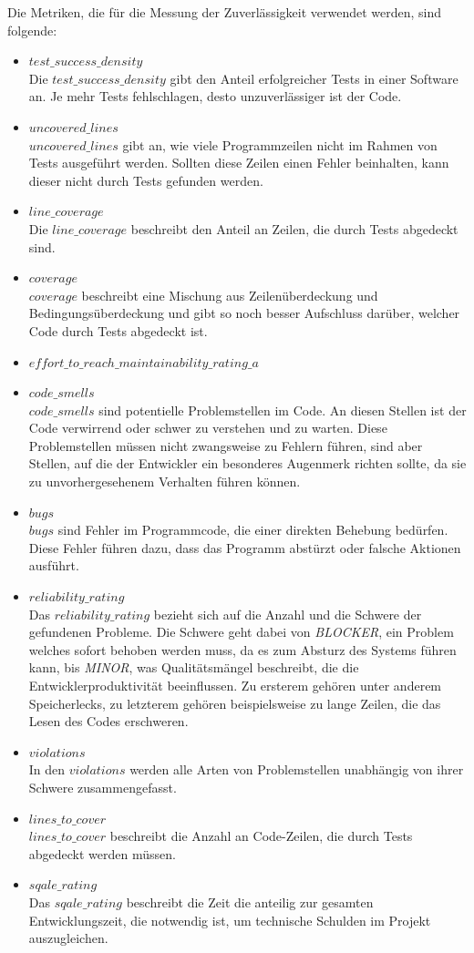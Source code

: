 \documentclass[
	oneside,  %
	ngerman, 
	final, 
	11pt, 
	a4paper, 
	1.1headlines, 
	headinclude=false, 
	footinclude=false, 
	mpinclude=false, 
	pagesize, 
	onecolumn, 
	titlepage, 
	parskip=half, 
	headsepline, 
	chapterprefix=false, 
	version=first, 
	listof=totoc, 
	bibliography=totoc, 
	toc=graduated, 
	fleqn
]{scrbook}
\begin{document}
Die Metriken, die für die Messung der Zuverlässigkeit verwendet werden, sind folgende:
\begin{itemize}
	\item $test\_success\_density$\\
	Die $test\_success\_density$ gibt den Anteil erfolgreicher Tests in einer Software an.
	Je mehr Tests fehlschlagen, desto unzuverlässiger ist der Code.
	\item $uncovered\_lines$\\
	$uncovered\_lines$ gibt an, wie viele Programmzeilen nicht im Rahmen von Tests ausgeführt werden.
	Sollten diese Zeilen einen Fehler beinhalten, kann dieser nicht durch Tests gefunden werden.
	\item $line\_coverage$\\
	Die $line\_coverage$ beschreibt den Anteil an Zeilen, die durch Tests abgedeckt sind.
	\item $coverage$\\
	$coverage$ beschreibt eine Mischung aus Zeilenüberdeckung und Bedingungsüberdeckung und gibt so noch besser Aufschluss darüber, welcher Code durch Tests abgedeckt ist.
	\item $effort\_to\_reach\_maintainability\_rating\_a$ %
	\item $code\_smells$\\
	$code\_smells$ sind potentielle Problemstellen im Code.
	An diesen Stellen ist der Code verwirrend oder schwer zu verstehen und zu warten.
	Diese Problemstellen müssen nicht zwangsweise zu Fehlern führen, sind aber Stellen, auf die der Entwickler ein besonderes Augenmerk richten sollte, da sie zu unvorhergesehenem Verhalten führen können.
	\item $bugs$\\
	$bugs$ sind Fehler im Programmcode, die einer direkten Behebung bedürfen.
	Diese Fehler führen dazu, dass das Programm abstürzt oder falsche Aktionen ausführt.
	\item $reliability\_rating$\\
	Das $reliability\_rating$ bezieht sich auf die Anzahl und die Schwere der gefundenen Probleme.
	Die Schwere geht dabei von \textit{BLOCKER}, ein Problem welches sofort behoben werden muss, da es zum Absturz des Systems führen kann, bis \textit{MINOR}, was Qualitätsmängel beschreibt, die die Entwicklerproduktivität beeinflussen.
	Zu ersterem gehören unter anderem Speicherlecks, zu letzterem gehören beispielsweise zu lange Zeilen, die das Lesen des Codes erschweren.
	\item $violations$\\
	In den $violations$ werden alle Arten von Problemstellen unabhängig von ihrer Schwere zusammengefasst.
	\item $lines\_to\_cover$\\
	$lines\_to\_cover$ beschreibt die Anzahl an Code-Zeilen, die durch Tests abgedeckt werden müssen.
	\item $sqale\_rating$\\
	Das $sqale\_rating$ beschreibt die Zeit die anteilig zur gesamten Entwicklungszeit, die notwendig ist, um technische Schulden im Projekt auszugleichen.
\end{itemize}
\end{document}
